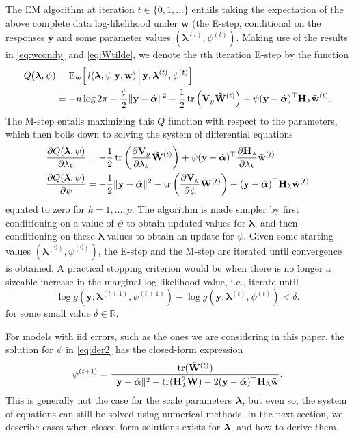 The EM algorithm at iteration $t \in \{0, 1, \dots\}$ entails taking the expectation of the above complete data log-likelihood under $\mathbf w$ (the E-step, conditional on the responses $\mathbf y$ and some parameter values $(\boldsymbol{\lambda}^{(t)}, \psi^{(t)})$. Making use of the results in \eqref{eq:wcondy} and \eqref{eq:Wtilde}, we denote the $t$th iteration E-step by the function
\begin{align*}
  Q(\boldsymbol\lambda, \psi)
  &= \operatorname{E}_{{\mathbf w}}\!\Big[\, l(\boldsymbol\lambda, \psi | \mathbf y, {\mathbf w}) \, \Big| \, \mathbf y, \boldsymbol\lambda^{(t)}, \psi^{(t)} \Big]  \\
  &= - n \log 2\pi - \frac{\psi}{2} \Vert \mathbf y - \hat{\boldsymbol\alpha} \Vert^2 - \frac{1}{2} \operatorname{tr} \left( \mathbf V_y \tilde{\mathbf W}^{(t)} \right) + \psi(\mathbf y - \hat{\boldsymbol\alpha})^\top \mathbf H_\lambda \tilde{\mathbf w}^{(t)}.
\end{align*}
The M-step entails maximizing this $Q$ function with respect to the parameters, which then boils down to solving the system of differential equations
\begin{align}
	\frac{\partial Q(\boldsymbol\lambda, \psi)}{\partial \lambda_k}
	&= - \frac{1}{2} \operatorname{tr} \left( \frac{\partial \mathbf V_y}{\partial \lambda_k} \tilde{{\mathbf W}}^{(t)} \right) + \psi(\mathbf y - \hat{\boldsymbol\alpha})^\top \frac{\partial\mathbf H_\lambda}{\partial \lambda_k} \tilde{{\mathbf w}}^{(t)} \label{eq:der1} \\
	\frac{\partial Q(\boldsymbol\lambda, \psi)}{\partial \psi}
	&= - \frac{1}{2} \Vert \mathbf y - \hat{\boldsymbol\alpha} \Vert^2 - \operatorname{tr} \left( \frac{\partial \mathbf V_y}{\partial \psi} \tilde{{\mathbf W}}^{(t)} \right) + (\mathbf y - \hat{\boldsymbol\alpha})^\top \mathbf H_\lambda \tilde{{\mathbf w}}^{(t)} \label{eq:der2}
\end{align}
equated to zero for $k = 1, \dots, p$. The algorithm is made simpler by first conditioning on a value of $\psi$ to obtain updated values for $\boldsymbol\lambda$, and then conditioning on these $\boldsymbol\lambda$ values to obtain an update for $\psi$. Given some starting values $(\boldsymbol{\lambda}^{(0)}, \psi^{(0)})$, the E-step and the M-step are iterated until convergence is obtained. A practical stopping criterion would be when there is no longer a sizeable increase in the marginal log-likelihood value, i.e., iterate until
\[
	\log g(\mathbf y; \boldsymbol{\lambda}^{(t+1)}, \psi^{(t+1)}) - \log g(\mathbf y; \boldsymbol{\lambda}^{(t)}, \psi^{(t)}) < \delta.
\]
for some small value $\delta \in \mathbb R$.

For models with iid errors, such as the ones we are considering in this paper, the solution for $\psi$ in \eqref{eq:der2} has the closed-form expression 
\[
	\psi^{(t+1)} = \frac{\operatorname{tr} ( \tilde{\mathbf W}^{(t)} )}{\Vert \mathbf y - \hat{\boldsymbol\alpha} \Vert^2 + \operatorname{tr}(\mathbf H_\lambda^2 \tilde{\mathbf W}) - 2(\mathbf y - \hat{\boldsymbol\alpha})^\top\mathbf {\mathbf H_\lambda} \tilde{\mathbf w}} .
\]
This is generally not the case for the scale parameters $\boldsymbol\lambda$, but even so, the system of equations can still be solved using numerical methods. In the next section, we describe cases when closed-form solutions exists for $\boldsymbol\lambda$, and how to derive them.



